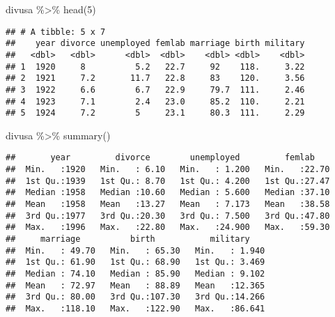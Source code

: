 \documentclass[
]{article}
\newenvironment{Shaded}{\begin{snugshade}}{\end{snugshade}}
\newcommand{\DecValTok}[1]{\textcolor[rgb]{0.00,0.00,0.81}{#1}}
\newcommand{\FunctionTok}[1]{\textcolor[rgb]{0.00,0.00,0.00}{#1}}
\newcommand{\NormalTok}[1]{#1}
\newcommand{\SpecialCharTok}[1]{\textcolor[rgb]{0.00,0.00,0.00}{#1}}
\begin{document}
\begin{Shaded}
\begin{Highlighting}[]
\NormalTok{divusa }\SpecialCharTok{\%\textgreater{}\%} \FunctionTok{head}\NormalTok{(}\DecValTok{5}\NormalTok{)}
\end{Highlighting}
\end{Shaded}

\begin{verbatim}
## # A tibble: 5 x 7
##    year divorce unemployed femlab marriage birth military
##   <dbl>   <dbl>      <dbl>  <dbl>    <dbl> <dbl>    <dbl>
## 1  1920     8          5.2   22.7     92    118.     3.22
## 2  1921     7.2       11.7   22.8     83    120.     3.56
## 3  1922     6.6        6.7   22.9     79.7  111.     2.46
## 4  1923     7.1        2.4   23.0     85.2  110.     2.21
## 5  1924     7.2        5     23.1     80.3  111.     2.29
\end{verbatim}

\begin{Shaded}
\begin{Highlighting}[]
\NormalTok{divusa }\SpecialCharTok{\%\textgreater{}\%} \FunctionTok{summary}\NormalTok{()}
\end{Highlighting}
\end{Shaded}

\begin{verbatim}
##       year         divorce        unemployed         femlab     
##  Min.   :1920   Min.   : 6.10   Min.   : 1.200   Min.   :22.70  
##  1st Qu.:1939   1st Qu.: 8.70   1st Qu.: 4.200   1st Qu.:27.47  
##  Median :1958   Median :10.60   Median : 5.600   Median :37.10  
##  Mean   :1958   Mean   :13.27   Mean   : 7.173   Mean   :38.58  
##  3rd Qu.:1977   3rd Qu.:20.30   3rd Qu.: 7.500   3rd Qu.:47.80  
##  Max.   :1996   Max.   :22.80   Max.   :24.900   Max.   :59.30  
##     marriage          birth           military     
##  Min.   : 49.70   Min.   : 65.30   Min.   : 1.940  
##  1st Qu.: 61.90   1st Qu.: 68.90   1st Qu.: 3.469  
##  Median : 74.10   Median : 85.90   Median : 9.102  
##  Mean   : 72.97   Mean   : 88.89   Mean   :12.365  
##  3rd Qu.: 80.00   3rd Qu.:107.30   3rd Qu.:14.266  
##  Max.   :118.10   Max.   :122.90   Max.   :86.641
\end{verbatim}
\end{document}
